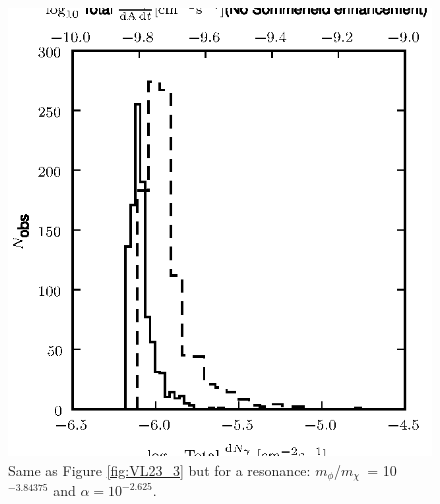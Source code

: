 \documentclass[aps,prd,twocolumn,amsmath,amssymb,floatfix,nofootinbib,10pt]{revtex4}
\newcommand{\mdm}{\ensuremath{m_{\chi}}}
\newcommand{\mv}{\ensuremath{m_{\phi}}}
\begin{document}
\begin{figure}
\centering
\includegraphics{hist_-3.84375_-2.625_10_3.eps}
\caption{Same as Figure \ref{fig:VL23_3} but for a resonance:
\mv/\mdm\ = 10$^{-3.84375}$ and $\alpha = 10^{-2.625}$.}%
\label{fig:VLresonance2}%
\end{figure}
\end{document}
